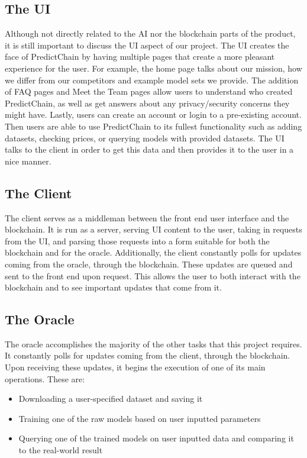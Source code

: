 \documentclass{article}
\begin{document}
    \subsection{The UI}
    Although not directly related to the AI nor the blockchain parts of the product, it is still important to discuss
    the UI aspect of our project. The UI creates the face of PredictChain by having multiple pages that create a more
    pleasant experience for the user. For example, the home page talks about our mission, how we differ from our
    competitors and example model sets we provide. The addition of FAQ pages and Meet the Team pages allow users to
    understand who created PredictChain, as well as get answers about any privacy/security concerns they might have.
    Lastly, users can create an account or login to a pre-existing account. Then users are able to use PredictChain
    to its fullest functionality such as adding datasets, checking prices, or querying models with provided datasets.
    The UI talks to the client in order to get this data and then provides it to the user in a nice manner.

    \subsection{The Client}

    The client serves as a middleman between the front end user interface and the
    blockchain.  It is run as a server, serving UI content to the user, taking in requests from the UI, and parsing those
    requests into a form suitable for both the blockchain and for the oracle.  Additionally, the client constantly polls
    for updates coming from the oracle, through the blockchain.  These updates are queued and sent to the front end upon
    request. This allows the user to both interact with the blockchain and to see important updates that come from it.

    \subsection{The Oracle}

    The oracle accomplishes the majority of the other tasks that this project requires.  It constantly polls for updates
    coming from the client, through the blockchain.  Upon receiving these updates, it begins the execution of one of its
    main operations.  These are:

    \begin{itemize}
        \item Downloading a user-specified dataset and saving it
        \item Training one of the raw models based on user inputted parameters
        \item Querying one of the trained models on user inputted data and comparing it to the real-world result
    \end{itemize}
\end{document}
